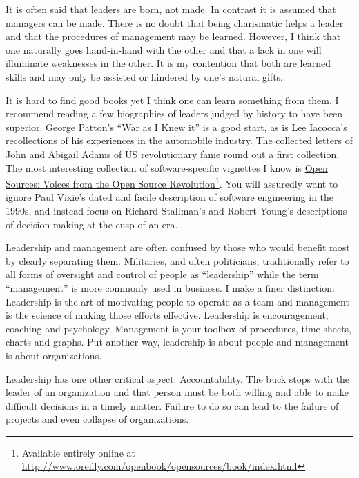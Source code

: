 It is often said that leaders are born, not made.  In contrast it is assumed that managers can be made.  There is no doubt that being charismatic helps a leader and that the procedures of management may be learned.  However, I think that one naturally goes hand-in-hand with the other and that a lack in one will illuminate weaknesses in the other.  It is my contention that both are learned skills and may only be assisted or hindered by one's natural gifts.

It is hard to find good books yet I think one can learn something from them.  I recommend reading a few biographies of leaders judged by history to have been superior.  George Patton's ``War as I Knew it'' is a good start, as is Lee Iacocca's recollections of his experiences in the automobile industry. The collected letters of John and Abigail Adams of US revolutionary fame round out a first collection. The most interesting collection of software-specific vignettes I know is \underline{Open Sources: Voices from the Open Source Revolution}\footnote{Available entirely online at \href{http://www.oreilly.com/openbook/opensources/book/index.html}{http://www.oreilly.com/openbook/opensources/book/index.html}}. You will assuredly want to ignore Paul Vixie's dated and facile description of software engineering in the 1990s, and instead focus on Richard Stallman's and Robert Young's descriptions of decision-making at the cusp of an era.

Leadership and management are often confused by those who would benefit most by clearly separating them.  Militaries, and often politicians, traditionally refer to all forms of oversight and control of people as ``leadership'' while the term ``management'' is more commonly used in business.  I make a finer distinction:  Leadership is the art of motivating people to operate as a team and management is the science of making those efforts effective.  Leadership is encouragement, coaching and psychology.  Management is your toolbox of procedures, time sheets, charts and graphs.  Put another way, leadership is about people and management is about organizations.

Leadership has one other critical aspect:  Accountability. The buck stops with the leader of an organization and that person must be both willing and able to make difficult decisions in a timely matter.  Failure to do so can lead to the failure of projects and even collapse of organizations.

